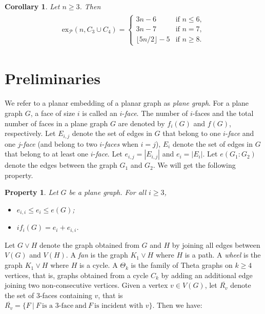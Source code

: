\documentclass[12pt]{article}
\newtheorem{cor}{Corollary}[section]
\newtheorem{pro}{Property}[section]
\newcommand{\ex}{\mathrm{ex}}
\begin{document}
\begin{cor}\cite{li2024}
    Let $n\geq 3$. Then
    \begin{align*}
        \begin{split}
            \ex_{\mathcal{P}}(n,C_3\cup C_4) = \left\{
                \begin{array}{ll}
                3n-6 & \text{if } n \leq 6,\\
                3n-7 & \text{if } n=7,\\
                \lfloor 5n/2 \rfloor - 5 & \text{if } 
                n\geq 8.
                \end{array}
            \right.
        \end{split}
    \end{align*}
\end{cor}


\section{Preliminaries}

We refer to a planar embedding of a planar graph as \emph{plane graph}.
For a plane graph $G$, a face of size $i$ is called an $i$-\emph{face}. The number of $i$-faces and the total number of faces in a plane graph $G$ are denoted by $f_i(G)$ and $f(G)$, respectively. Let $E_{i,j}$ denote the set of edges in $G$ that belong to one $i$-\emph{face} and one $j$-\emph{face} (and belong to two $i$-\emph{faces} when $i=j$), $E_i$ denote the set of edges in $G$ that belong to at least one $i$-\emph{face}. Let $e_{i,j}=|E_{i,j}|$ and $e_i = |E_i|$. Let $e(G_1:G_2)$ denote the edges between  the graph $G_1$ and $G_2$. We will get the following property.

\begin{pro}\label{pro1}  Let $G$ be a plane graph. For all $i \geq 3$,
    \begin{itemize}
        \item[1)] $e_{i,i} \leq e_i \leq e(G)$;
        
        \item[2)] $if_i(G) = e_i+e_{i,i}$.
        
    \end{itemize}
\end{pro}

Let $G\vee H$ denote the graph obtained from $G$ and $H$ by joining all edges between $V(G)$ and $V(H)$.
A \emph{fan} is the graph $K_1\vee H$ where $H$ is a path. A \emph{wheel} is the graph $K_1\vee H$ where $H$ is a cycle. A $\Theta_{k}$ is the family of Theta graphs on $k\geq4$ vertices, that is, graphs obtained from a cycle $C_k$ by adding an additional edge joining two non-consecutive vertices. Given a vertex $v \in V(G)$, let $\overline{R_v}$ denote the set of $3$-faces containing $v$, that is $\overline{R_v}=\{F \ | \ F \ \text{is a 3-face} \ \text{and} \ F \ \text{is incident with } v\}$. Then we have:
\end{document}
